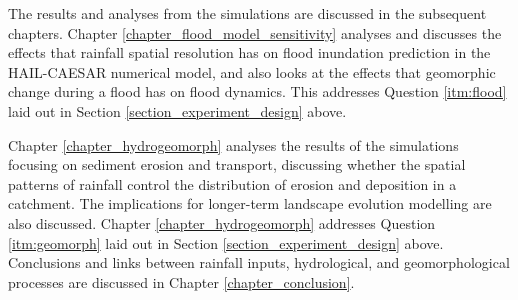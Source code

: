 The results and analyses from the simulations are discussed in the subsequent chapters. Chapter \ref{chapter_flood_model_sensitivity} analyses and discusses the effects that rainfall spatial resolution has on flood inundation prediction in the HAIL-CAESAR numerical model, and also looks at the effects that geomorphic change during a flood has on flood dynamics. This addresses Question \ref{itm:flood} laid out in Section \ref{section_experiment_design} above. 

Chapter \ref{chapter_hydrogeomorph} analyses the results of the simulations focusing on sediment erosion and transport, discussing whether the spatial patterns of rainfall control the distribution of erosion and deposition in a catchment. The implications for longer-term landscape evolution modelling are also discussed. Chapter \ref{chapter_hydrogeomorph} addresses Question \ref{itm:geomorph} laid out in Section \ref{section_experiment_design} above. Conclusions and links between rainfall inputs, hydrological, and geomorphological processes are discussed in Chapter \ref{chapter_conclusion}.
